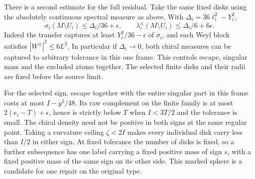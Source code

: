 There is a second estimate for the full residual. Take the same fixed
disks using the absolutely continuous spectral measure as above.
With \(\Delta_i=36\ell_i^2-Y_i^2\),
\[
   \sigma_i(M\setminus U_i)\le \Delta_i/36+\epsilon,\qquad
   \lambda_i^\pm(M\setminus U_i)\le \Delta_i/6+6\epsilon .
\]
Indeed the transfer captures at least \(Y_i^2/36-\epsilon\) of
\(\sigma_i\), and each Weyl block satisfies \(|W^\pm|^2\le6L^2\).
In particular if \(\Delta_i\to0\), both chiral measures can be
captured to arbitrary tolerance in this one frame. This controls
escape, singular mass and the excluded atoms together. The selected
finite disks and their radii are fixed before the source limit.

For the selected sign, escape together with the entire singular part
in this frame costs at most \(I-y^2/48\). Its raw complement on the
finite family is at most \(2(e_i-T)+\epsilon\), hence is strictly
below \(T\) when \(I<3T/2\) and the tolerance is small. The chiral
density need not be positive in both signs at the same regular point.
Taking a curvature ceiling \(\zeta<2I\) makes every individual disk
carry less than \(I/2\) in either sign. At fixed tolerance the number
of disks is fixed, so a further subsequence has one label carrying a
fixed positive mass of sign \(s\), with a fixed positive mass of the
same sign on its other side. This marked sphere is a candidate for
one repair on the original type.

